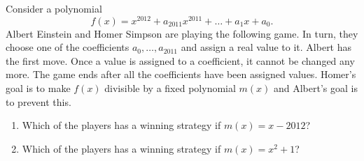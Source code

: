 \documentclass{article}
\begin{document}
\setlength{\parindent}{0pt}
Consider a polynomial$$f(x)=x^{2012}+a_{2011}x^{2011}+\dots+a_{1}x+a_{0}.$$Albert Einstein and Homer Simpson are playing the following game. In turn, they choose one of the coefficients $a_{0},\dots,a_{2011}$ and assign a real value to it. Albert has the first move. Once a value is assigned to a coefficient, it cannot be changed any more. The game ends after all the coefficients have been assigned values.\newline
Homer's goal is to make $f(x)$ divisible by a fixed polynomial $m(x)$ and Albert's goal is to prevent this.
\begin{enumerate}[label=\alph*)]
\item Which of the players has a winning strategy if $m(x)=x-2012$?
\item Which of the players has a winning strategy if $m(x)=x^{2}+1$?
\end{enumerate}
\end{document}
